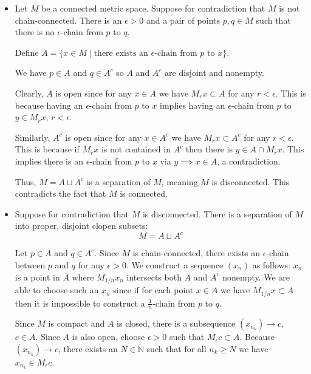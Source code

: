 \begin{solution}
    \begin{itemize}
        \item[(a)]
              Let $M$ be a connected metric space. Suppose for contradiction that
              $M$ is not chain-connected. There is an $\epsilon > 0$ and a pair
              of points $p, q \in M$ such that there is no $\epsilon$-chain from $p$ to $q$.

              Define $A = \{x \in M \mid \text{there exists an } \epsilon\text{-chain from }
                  p \text{ to } x\}$.

              We have $p \in A$ and $q \in A^c$ so $A$ and $A^c$ are disjoint and nonempty.

              Clearly, $A$ is open since for any $x \in A$ we have $M_r x \subset A$
              for any $r < \epsilon$. This is because having an $\epsilon$-chain from
              $p$ to $x$ implies having an $\epsilon$-chain from $p$ to $y \in M_r x$,
              $r < \epsilon$.

              Similarly, $A^c$ is open since for any $x \in A^c$ we have $M_r x \subset A^c$
              for any $r < \epsilon$. This is because if $M_r x$ is not contained in $A^c$
              then there is $y \in A \cap M_r x$. This implies there is an $\epsilon$-chain
              from $p$ to $x$ via $y \implies x \in A$,
              a contradiction.

              Thus, $M = A \sqcup A^c$ is a separation of $M$, meaning $M$ is disconnected.
              This contradicts the fact that $M$ is connected.
        \item[(b)]
              Suppose for contradiction that $M$ is disconnected. There is a
              separation of $M$ into proper, disjoint clopen subsets:
              $$M = A \sqcup A^c$$

              Let $p \in A$ and $q \in A^c$. Since $M$ is chain-connected, there exists
              an $\epsilon$-chain between $p$ and $q$ for any $\epsilon > 0$. We construct a
              sequence $(x_n)$ as follows: $x_n$ is a point in $A$ where $M_{1/n} x_n$
              intersects both $A$ and $A^c$ nonempty. We are able to choose such
              an $x_n$ since if for each point $x \in A$ we have $M_{1/n} x \subset A$ then
              it is impossible to construct a $\frac{1}{n}$-chain from $p$ to $q$.

              Since $M$ is compact and $A$ is closed, there is a subsequence
              $(x_{n_k}) \to c$, $c \in A$. Since $A$ is also open, choose $\epsilon > 0$
              such that $M_\epsilon c \subset A$. Because $(x_{n_k}) \to c$, there exists
              an $N \in \mathbb{N}$ such that for all $n_k \ge N$ we have $x_{n_k} \in M_\epsilon c$.


\end{itemize}
\end{solution}
